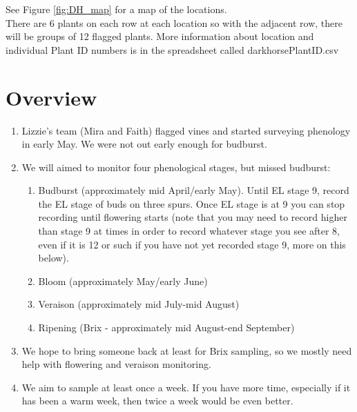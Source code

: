 \documentclass[11pt,letter]{article}
\begin{document}
See Figure \ref{fig:DH_map} for a map of the locations. \\

There are 6 plants on each row at each location so with the adjacent row, there will be groups of 12 flagged plants. More information about location and individual Plant ID numbers is in the spreadsheet called darkhorsePlantID.csv

\section{Overview}
\begin{enumerate}
  \item Lizzie's team (Mira and Faith) flagged vines and started surveying phenology in early May. We were not out early enough for budburst. 
  \item We will aimed to monitor four phenological stages, but missed budburst:
  \begin{enumerate}
	\item Budburst (approximately mid April/early May). Until EL stage 9, record the EL stage of buds on three spurs. Once EL stage is at 9 you can stop recording until flowering starts (note that you may need to record higher than stage 9 at times in order to record whatever stage you see after 8, even if it is 12 or such if you have not yet recorded stage 9, more on this below).
	\item Bloom (approximately May/early June)
  	\item Veraison (approximately mid July-mid August)
  	\item Ripening (Brix - approximately mid August-end September)
  \end{enumerate}
  \item We hope to bring someone back at least for Brix sampling, so we mostly need help with flowering and veraison monitoring. 
  \item We aim to sample at least once a week. If you have more time, especially if it has been a warm week, then twice a week would be even better.

\end{enumerate}
\end{document}
